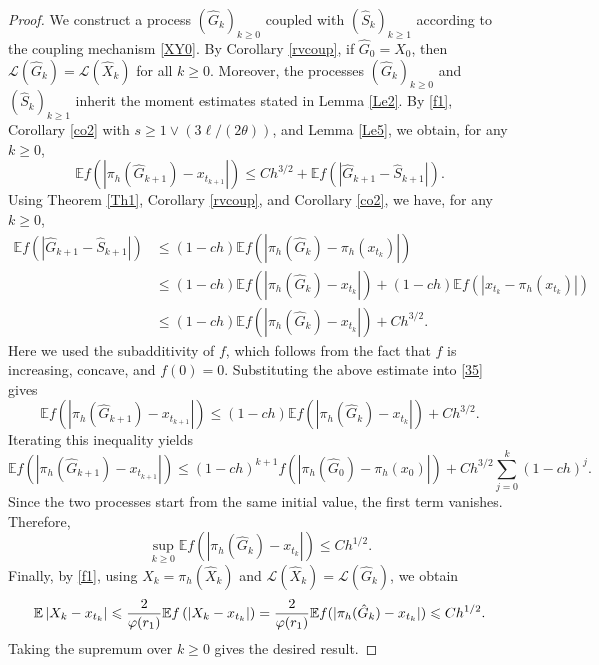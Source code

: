 \documentclass[aap]{imsart}
\theoremstyle{plain}
\theoremstyle{definition}
\begin{document}
			\begin{proof}
				We construct a process \((\hat G_k)_{k\geqslant 0}\) coupled with
				\((\hat S_k)_{k\geqslant 1}\) according to the coupling mechanism
				\eqref{XY0}. By Corollary \ref{rvcoup}, if
				\(\hat G_0=\hat X_0\), then \(\mathcal L(\hat G_k)=\mathcal L(\hat X_k)\) for all \(k\geqslant 0\).
				Moreover, the processes \((\hat G_k)_{k\geq 0}\) and
				\((\hat S_k)_{k\geq 1}\) inherit the moment estimates stated in Lemma \ref{Le2}. By \eqref{f1}, Corollary \ref{co2} with \(s\geqslant 1\vee(3\ell/(2\theta))\),
				and Lemma \ref{Le5}, we obtain, for any \(k\geqslant 0\),
				\begin{equation}\label{35}
					\mathbb E f\left(
					\left|\pi_h(\hat G_{k+1})-x_{t_{k+1}}\right|
					\right)
					\leqslant
					C h^{3/2}
					+
					\mathbb E f\left(
					\left|\hat G_{k+1}-\hat S_{k+1}\right|
					\right).
				\end{equation}				
				Using Theorem \ref{Th1}, Corollary \ref{rvcoup}, and Corollary \ref{co2}, we have, for any \(k\geqslant 0\),
				\[\begin{aligned}
					\mathbb E f\left(
					\left|\hat G_{k+1}-\hat S_{k+1}\right|
					\right)
					&\leqslant
					(1-ch)
					\mathbb E f\left(
					\left|\pi_h(\hat G_k)-\pi_h(x_{t_k})\right|
					\right)  \\
					&\leqslant
					(1-ch)
					\mathbb E f\left(
					\left|\pi_h(\hat G_k)-x_{t_k}\right|
					\right)+(1-ch)
					\mathbb E f\left(
					\left|x_{t_k}-\pi_h(x_{t_k})\right|
					\right)  \\
					&\leqslant(1-ch)
					\mathbb E f\left(
					\left|\pi_h(\hat G_k)-x_{t_k}\right|
					\right)
					+C h^{3/2}.
				\end{aligned}\]
				Here we used the subadditivity of \(f\), which follows from the fact
				that \(f\) is increasing, concave, and \(f(0)=0\).
				Substituting the above estimate into \eqref{35} gives
				\[\mathbb E f\left(
					\left|\pi_h(\hat G_{k+1})-x_{t_{k+1}}\right|
					\right)\leqslant
					(1-ch)
					\mathbb E f\left(
					\left|\pi_h(\hat G_k)-x_{t_k}\right|
					\right)
					+C h^{3/2}.\]
				Iterating this inequality yields
				\[\mathbb E f\left(
					\left|\pi_h(\hat G_{k+1})-x_{t_{k+1}}\right|
					\right)
					\leqslant
					(1-ch)^{k+1}
					f\left(
					\left|\pi_h(\hat G_0)-\pi_h(x_0)\right|
					\right)+
					C h^{3/2}
					\sum_{j=0}^{k}(1-ch)^j .\]
				Since the two processes start from the same initial value, the first
				term vanishes. Therefore,
				\[\sup_{k\geqslant 0}
				\mathbb E f\left(
				\left|\pi_h(\hat G_k)-x_{t_k}\right|
				\right)
				\leqslant C h^{1/2}.\]				
				Finally, by \eqref{f1}, using \(X_k=\pi_h(\hat X_k)\) and
				\(\mathcal L(\hat X_k)=\mathcal L(\hat G_k)\), we obtain
			$$\mathbb{E}\left|X_{k}-x_{t_{k}}\right|\leqslant \frac{2}{\varphi(r_1)}\mathbb{E} f\left(\left|X_{k}-x_{t_{k}}\right|\right)= \frac{2}{\varphi(r_1)}\mathbb{E} f(|\pi_h(\hat{G}_{k})-x_{t_{k}}|)\leqslant Ch^{1/2}.$$
				Taking the supremum over \(k\geqslant 0\) gives the desired result.
			\end{proof}
			
\end{document}
